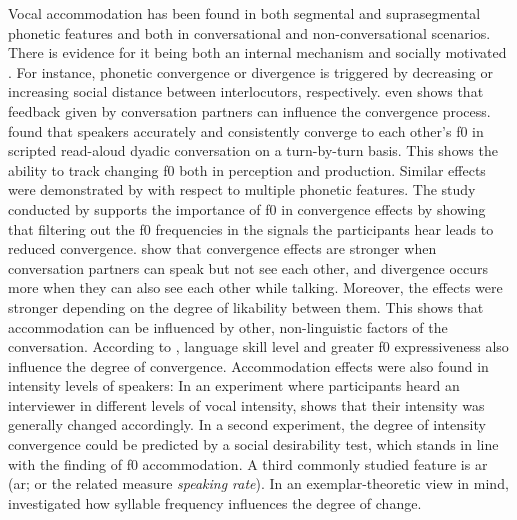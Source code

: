 Vocal accommodation has been found in both segmental \citep{Pardo2010conversational, Smith2007prosodic} and suprasegmental \citep{Walker2015repeat, Shockley2004imitation} phonetic features and
both in conversational \citep{Pardo2006phonetic, Lewandowski2012talent, Weise2018looking} and non-conversational \citep{Babel2014novelty, Shockley2004imitation} scenarios.
There is evidence for it being both an internal mechanism \citep{Pickering2004behavioral} and socially motivated \citep{Kim2011phonetic, Giles1991CAT, Babel2010dialect}.
For instance, phonetic convergence \citep{Giles1973mobility} or divergence \citep{Bourhis1977distinctiveness} is triggered by decreasing or increasing social distance between interlocutors, respectively.
 even shows that feedback given by conversation partners can influence the convergence process.
\citet{Aubanel2020speaking} found that speakers accurately and consistently converge to each other's \ac{f0} in scripted read-aloud dyadic conversation on a turn-by-turn basis.
This shows the ability to track changing \ac{f0} both in perception and production.
Similar effects were demonstrated by \citet{Pardo2013measuring} with respect to multiple phonetic features.
The study conducted by \citet{Babel2012role} supports the importance of \ac{f0} in convergence effects by showing that filtering out the \ac{f0} frequencies in the signals the participants hear leads to reduced convergence.
\citet{Schweitzer2017visibility} show that convergence effects are stronger when conversation partners can speak but not see each other, and divergence occurs more when they can also see each other while talking.
Moreover, the effects were stronger depending on the degree of likability between them.
This shows that accommodation can be influenced by other, non-linguistic factors of the conversation.
According to \citet{Lehnert2020relationship}, language skill level and greater \ac{f0} expressiveness also influence the degree of convergence.
Accommodation effects were also found in intensity levels of speakers:
In an experiment where participants heard an interviewer in different levels of vocal intensity, \citet{Natale1975convergence} shows that their intensity was generally changed accordingly.
In a second experiment, the degree of intensity convergence could be predicted by a social desirability test, which stands in line with the finding of \ac{f0} accommodation.
A third commonly studied feature is \acl{ar} (\acs{ar}; or the related measure \emph{speaking rate}).
In an exemplar-theoretic view in mind, \citet{Schweitzer2016exemplar} investigated how syllable frequency influences the degree of change.
